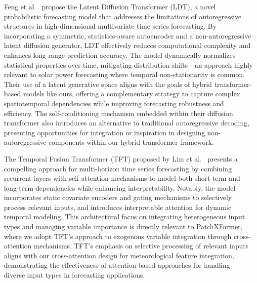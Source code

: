 \documentclass[12pt]{uomthesis}
\begin{document}
Feng et al.~\cite{feng2024latent} propose the Latent Diffusion Transformer (LDT), a novel probabilistic forecasting model that addresses the limitations of autoregressive structures in high-dimensional multivariate time series forecasting. By incorporating a symmetric, statistics-aware autoencoder and a non-autoregressive latent diffusion generator, LDT effectively reduces computational complexity and enhances long-range prediction accuracy. The model dynamically normalizes statistical properties over time, mitigating distribution shifts—an approach highly relevant to solar power forecasting where temporal non-stationarity is common. Their use of a latent generative space aligns with the goals of hybrid transformer-based models like ours, offering a complementary strategy to capture complex spatiotemporal dependencies while improving forecasting robustness and efficiency. The self-conditioning mechanism embedded within their diffusion transformer also introduces an alternative to traditional autoregressive decoding, presenting opportunities for integration or inspiration in designing non-autoregressive components within our hybrid transformer framework.

The Temporal Fusion Transformer (TFT) proposed by Lim et al.~\cite{lim2021temporal} presents a compelling approach for multi-horizon time series forecasting by combining recurrent layers with self-attention mechanisms to model both short-term and long-term dependencies while enhancing interpretability. Notably, the model incorporates static covariate encoders and gating mechanisms to selectively process relevant inputs, and introduces interpretable attention for dynamic temporal modeling. This architectural focus on integrating heterogeneous input types and managing variable importance is directly relevant to PatchXFormer, where we adopt TFT's approach to exogenous variable integration through cross-attention mechanisms. TFT's emphasis on selective processing of relevant inputs aligns with our cross-attention design for meteorological feature integration, demonstrating the effectiveness of attention-based approaches for handling diverse input types in forecasting applications.
\end{document}
